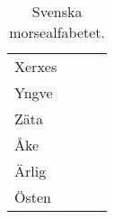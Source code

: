 \begin{table}[H]
\begin{tabular}{llll}
	Xerxes  & \MXerxes  &                       &                \\
	Yngve   & \MYngve   &                       &                \\
	Zäta    & \MZata    &                       &                \\
	Åke     & \MAke     &                       &                \\
	Ärlig   & \MArlig   &                       &                \\
	Östen   & \MOsten   & 
\end{tabular}
\normalsize
\caption{Svenska morsealfabetet.}
\label{tab:morsealfabetet}
\end{table}




